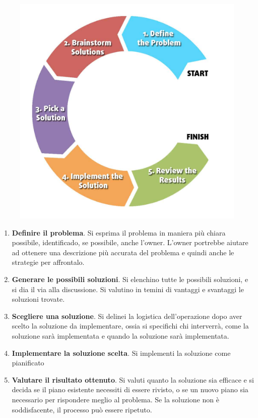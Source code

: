 \documentclass{article}
\begin{document}
\begin{figure}[h]
    \centering
    \includegraphics[scale=0.25]{./imgs/Problem-Solving-Cycle.jpg}
    \label{Problem Solving Cycle}
\end{figure}

\begin{enumerate}
    \item \textbf{Definire il problema}. Si esprima il problema in maniera più chiara possibile, identificado, se possibile, anche l'owner.
    L'owner portrebbe aiutare ad ottenere una descrizione più accurata del problema e quindi anche le strategie per affrontalo.
    \item \textbf{Generare le possibili soluzioni}. Si elenchino tutte le possibili soluzioni, e si dia il via alla discussione.
    Si valutino in temini di vantaggi e svantaggi le soluzioni trovate. 
    \item \textbf{Scegliere una soluzione}. Si delinei la logistica dell'operazione dopo aver scelto la soluzione da implementare, ossia
    si specifichi chi interverrà, come la soluzione sarà implementata e quando la soluzione sarà implementata.
    \item \textbf{Implementare la soluzione scelta}. Si implementi la soluzione come pianificato
    \item \textbf{Valutare il risultato ottenuto}. Si valuti quanto la soluzione sia efficace e si decida se il piano esistente necessiti di essere rivisto, 
    o se un nuovo piano sia necessario per rispondere meglio al problema. 
    Se la soluzione non è soddisfacente, il processo può essere ripetuto.     
\end{enumerate}
\end{document}
